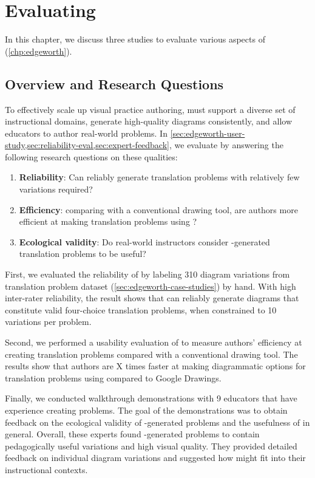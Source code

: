 \chapter{Evaluating \Edgeworth{}}
\label{chp:edgeworth-eval}

In this chapter, we discuss three studies to evaluate various aspects of \Edgeworth (\cref{chp:edgeworth}).

\section{Overview and Research Questions}

To effectively scale up visual practice authoring, \Edgeworth must support a diverse set of instructional domains, generate high-quality diagrams consistently, and allow educators to author real-world problems. In \cref{sec:edgeworth-user-study,sec:reliability-eval,sec:expert-feedback}, we evaluate \Edgeworth by answering the following research questions on these qualities:

\begin{enumerate}[label=RQ\arabic*]
    \item\label{rq:mut} \textbf{Reliability}: Can \Edgeworth reliably generate translation problems with relatively few variations required?
    \item\label{rq:eff} \textbf{Efficiency}: comparing with a conventional drawing tool, are authors more efficient at making translation problems using \Edgeworth? 
    \item\label{rq:eco} \textbf{Ecological validity}: Do real-world instructors consider \Edgeworth-generated translation problems to be useful? 
\end{enumerate}

First, we evaluated the reliability of \Edgeworth by labeling 310 diagram variations from translation problem dataset (\cref{sec:edgeworth-case-studies}) by hand. With high inter-rater reliability, the result shows that \Edgeworth can reliably generate diagrams that constitute valid four-choice translation problems, when constrained to 10 variations per problem.

Second, we performed a usability evaluation of \Edgeworth to measure authors' efficiency at creating translation problems compared with a conventional drawing tool. The results show that authors are X times faster at making diagrammatic options for translation problems using \Edgeworth compared to Google Drawings. 

Finally, we conducted walkthrough demonstrations with 9 educators that have experience creating problems. The goal of the demonstrations was to obtain feedback on the ecological validity of \Edgeworth-generated problems and the usefulness of \Edgeworth in general. Overall, these experts found \Edgeworth-generated problems to contain pedagogically useful variations and high visual quality. They provided detailed feedback on individual diagram variations and suggested how \Edgeworth might fit into their instructional contexts. 

